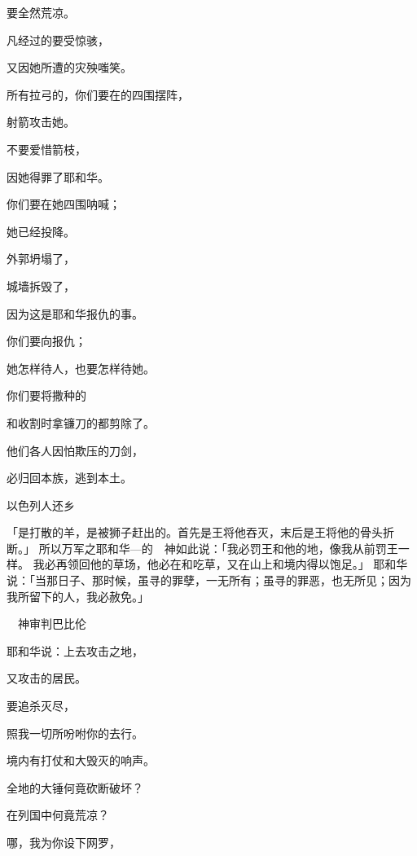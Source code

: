 {\par }{\Q 要全然荒凉。
\par }{\Q 凡经过{}的要受惊骇，
\par }{\Q 又因她所遭的灾殃嗤笑。
\par }{\Q {}所有拉弓的，你们要在{}的四围摆阵，
\par }{\Q 射箭攻击她。
\par }{\Q 不要爱惜箭枝，
\par }{\Q 因她得罪了耶和华。
\par }{\Q {}你们要在她四围呐喊；
\par }{\Q 她已经投降。
\par }{\Q 外郭坍塌了，
\par }{\Q 城墙拆毁了，
\par }{\Q 因为这是耶和华报仇的事。
\par }{\Q 你们要向{}报仇；
\par }{\Q 她怎样待人，也要怎样待她。
\par }{\Q {}你们要将{}撒种的
\par }{\Q 和收割时拿镰刀的都剪除了。
\par }{\Q 他们各人因怕欺压的刀剑，
\par }{\Q 必归回本族，逃到本土。
\par }{\SH 以色列人还乡
\par }{\PP {}「{}是打散的羊，是被狮子赶出的。首先是{}王将他吞灭，末后是{}王{}将他的骨头折断。」
所以万军之耶和华—{}的　神如此说：「我必罚{}王和他的地，像我从前罚{}王一样。
我必再领{}回他的草场，他必在{}和{}吃草，又在{}山上和{}境内得以饱足。」
耶和华说：「当那日子、那时候，虽寻{}的罪孽，一无所有；虽寻{}的罪恶，也无所见；因为我所留下的人，我必赦免。」
\par }{\SH 　神审判巴比伦
\par }{\Q {}耶和华说：上去攻击{}之地，
\par }{\Q 又攻击{}的居民。
\par }{\Q 要追杀灭尽，
\par }{\Q 照我一切所吩咐你的去行。
\par }{\Q {}境内有打仗和大毁灭的响声。
\par }{\Q {}全地的大锤何竟砍断破坏？
\par }{在列国中何竟荒凉？
\par }{\Q {}哪，我为你设下网罗，
}
